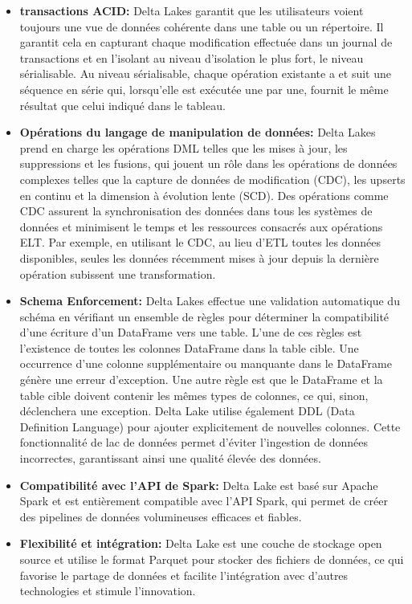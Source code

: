 \begin{itemize}
    \item[\textbullet] \textbf{transactions ACID:} Delta Lakes garantit que les utilisateurs voient toujours une vue de données cohérente dans une table ou un répertoire. Il garantit cela en capturant chaque modification effectuée dans un journal de transactions et en l'isolant au niveau d'isolation le plus fort, le niveau sérialisable. Au niveau sérialisable, chaque opération existante a et suit une séquence en série qui, lorsqu'elle est exécutée une par une, fournit le même résultat que celui indiqué dans le tableau.
    \item[\textbullet] \textbf{Opérations du langage de manipulation de données:} Delta Lakes prend en charge les opérations DML telles que les mises à jour, les suppressions et les fusions, qui jouent un rôle dans les opérations de données complexes telles que la capture de données de modification (CDC), les upserts en continu et la dimension à évolution lente (SCD). Des opérations comme CDC assurent la synchronisation des données dans tous les systèmes de données et minimisent le temps et les ressources consacrés aux opérations ELT. Par exemple, en utilisant le CDC, au lieu d'ETL toutes les données disponibles, seules les données récemment mises à jour depuis la dernière opération subissent une transformation.
    \item[\textbullet] \textbf{Schema Enforcement:} Delta Lakes effectue une validation automatique du schéma en vérifiant un ensemble de règles pour déterminer la compatibilité d'une écriture d'un DataFrame vers une table. L'une de ces règles est l'existence de toutes les colonnes DataFrame dans la table cible. Une occurrence d'une colonne supplémentaire ou manquante dans le DataFrame génère une erreur d'exception. Une autre règle est que le DataFrame et la table cible doivent contenir les mêmes types de colonnes, ce qui, sinon, déclenchera une exception. Delta Lake utilise également DDL (Data Definition Language) pour ajouter explicitement de nouvelles colonnes. Cette fonctionnalité de lac de données permet d'éviter l'ingestion de données incorrectes, garantissant ainsi une qualité élevée des données.
    \item[\textbullet] \textbf{Compatibilité avec l'API de Spark:} Delta Lake est basé sur Apache Spark et est entièrement compatible avec l'API Spark, qui permet de créer des pipelines de données volumineuses efficaces et fiables.
    \item[\textbullet] \textbf{Flexibilité et intégration:} Delta Lake est une couche de stockage open source et utilise le format Parquet pour stocker des fichiers de données, ce qui favorise le partage de données et facilite l'intégration avec d'autres technologies et stimule l'innovation.
\end{itemize}



